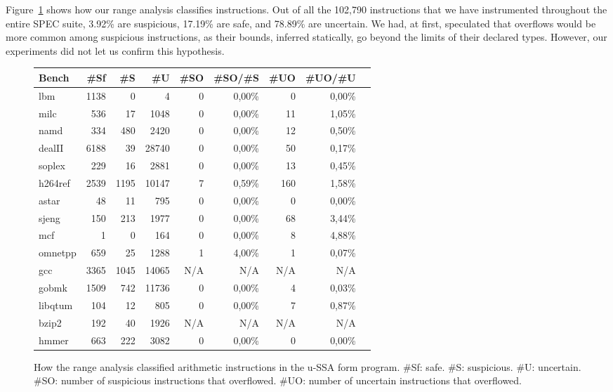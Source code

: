 \documentclass[preprint]{sigplanconf}[10pt]
\begin{document}
Figure~\ref{fig:classificationTable} shows how our range analysis
classifies instructions.
Out of all the 102,790 instructions that we have instrumented throughout the
entire SPEC suite, 3.92\% are suspicious, 17.19\% are safe, and
78.89\% are uncertain.
We had, at first, speculated that overflows would be more common among
suspicious instructions, as their bounds, inferred statically, go beyond the
limits of their declared types.
However, our experiments did not let us confirm this hypothesis.

\begin{figure}[t!]
\begin{center}
\begin{scriptsize}
\begin{tabular}{|l|r|r|r|r|r|r|r|r|}
\hline
Bench & \#Sf & \#S & \#U & \#SO & \#SO/\#S & \#UO & \#UO/\#U
\\ \hline
lbm     & 1138 & 0    & 4 & 0 & 0,00\% & 0 & 0,00\% \\ \hline
milc    & 536  & 17   & 1048  & 0 & 0,00\% & 11 & 1,05\% \\ \hline
namd    & 334  & 480  & 2420  & 0 & 0,00\% & 12 & 0,50\% \\ \hline
dealII  & 6188 & 39   & 28740  & 0 & 0,00\% & 50 & 0,17\% \\ \hline
soplex  & 229  & 16   & 2881 & 0 & 0,00\% & 13 & 0,45\% \\ \hline
h264ref & 2539 & 1195 & 10147 & 7 & 0,59\% & 160 & 1,58\% \\ \hline
astar   & 48   & 11   & 795 & 0 & 0,00\% & 0 & 0,00\% \\ \hline
sjeng   & 150  & 213  & 1977 &0 & 0,00\% & 68 & 3,44\% \\ \hline
mcf     & 1    & 0    & 164 & 0 & 0,00\% & 8 & 4,88\% \\ \hline
omnetpp & 659  & 25   & 1288 & 1 & 4,00\% & 1 & 0,07\% \\ \hline
gcc     & 3365 & 1045 & 14065 & N/A & N/A & N/A & N/A \\ \hline
gobmk   & 1509 & 742  & 11736 & 0 & 0,00\% & 4 & 0,03\% \\ \hline
libqtum & 104  & 12   & 805 & 0 & 0,00\% & 7 & 0,87\% \\ \hline
bzip2   & 192  & 40   & 1926 & N/A & N/A & N/A & N/A \\ \hline
hmmer   & 663  & 222  & 3082 & 0 & 0,00\% & 0 & 0,00\% \\ \hline
\end{tabular}
\end{scriptsize}
\end{center}
\caption{\label{fig:classificationTable}
How the range analysis classified arithmetic instructions in the 
u-SSA form program.
\#Sf: safe.
\#S: suspicious.
\#U: uncertain.
\#SO: number of suspicious instructions that overflowed.
\#UO: number of uncertain instructions that overflowed.
}
\end{figure}
\end{document}
